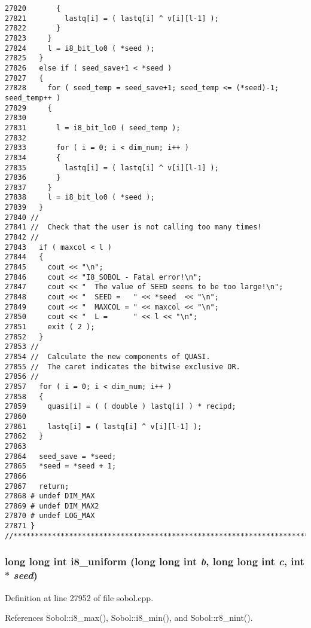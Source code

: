 \begin{Code}
\begin{verbatim}
27820       {
27821         lastq[i] = ( lastq[i] ^ v[i][l-1] );
27822       }
27823     }
27824     l = i8_bit_lo0 ( *seed );
27825   }
27826   else if ( seed_save+1 < *seed )
27827   {
27828     for ( seed_temp = seed_save+1; seed_temp <= (*seed)-1; seed_temp++ )
27829     {
27830 
27831       l = i8_bit_lo0 ( seed_temp );
27832 
27833       for ( i = 0; i < dim_num; i++ )
27834       {
27835         lastq[i] = ( lastq[i] ^ v[i][l-1] );
27836       }
27837     }
27838     l = i8_bit_lo0 ( *seed );
27839   }
27840 //
27841 //  Check that the user is not calling too many times!
27842 //
27843   if ( maxcol < l )
27844   {
27845     cout << "\n";
27846     cout << "I8_SOBOL - Fatal error!\n";
27847     cout << "  The value of SEED seems to be too large!\n";
27848     cout << "  SEED =   " << *seed  << "\n";
27849     cout << "  MAXCOL = " << maxcol << "\n";
27850     cout << "  L =      " << l << "\n";
27851     exit ( 2 );
27852   }
27853 //
27854 //  Calculate the new components of QUASI.
27855 //  The caret indicates the bitwise exclusive OR.
27856 //
27857   for ( i = 0; i < dim_num; i++ )
27858   {
27859     quasi[i] = ( ( double ) lastq[i] ) * recipd;
27860 
27861     lastq[i] = ( lastq[i] ^ v[i][l-1] );
27862   }
27863 
27864   seed_save = *seed;
27865   *seed = *seed + 1;
27866 
27867   return;
27868 # undef DIM_MAX
27869 # undef DIM_MAX2
27870 # undef LOG_MAX
27871 }
//****************************************************************************80
\end{verbatim}
\end{Code}


\subsubsection{\setlength{\rightskip}{0pt plus 5cm}long long int i8\_\-uniform (long long int {\em b}, long long int {\em c}, int $\ast$ {\em seed})}\label{test_2sobol_8H_038950bacc0ae51128de8764951eb95a}




Definition at line 27952 of file sobol.cpp.

References Sobol::i8\_\-max(), Sobol::i8\_\-min(), and Sobol::r8\_\-nint().

